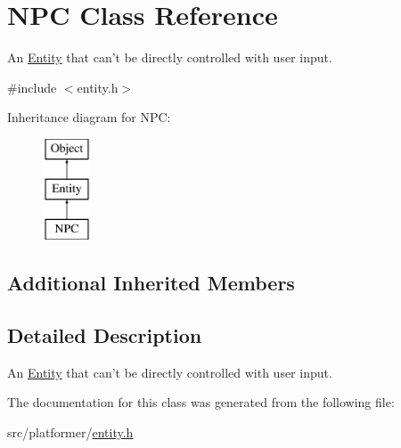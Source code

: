 \hypertarget{class_n_p_c}{\section{N\-P\-C Class Reference}
\label{class_n_p_c}
}


An \hyperlink{class_entity}{Entity} that can't be directly controlled with user input.  




{\ttfamily \#include $<$entity.\-h$>$}

Inheritance diagram for N\-P\-C\-:\begin{figure}[H]
\begin{center}
\leavevmode
\includegraphics[height=3.000000cm]{class_n_p_c}
\end{center}
\end{figure}
\subsection*{Additional Inherited Members}


\subsection{Detailed Description}
An \hyperlink{class_entity}{Entity} that can't be directly controlled with user input. 

The documentation for this class was generated from the following file\-:\begin{DoxyCompactItemize}
\item 
src/platformer/\hyperlink{entity_8h}{entity.\-h}\end{DoxyCompactItemize}
